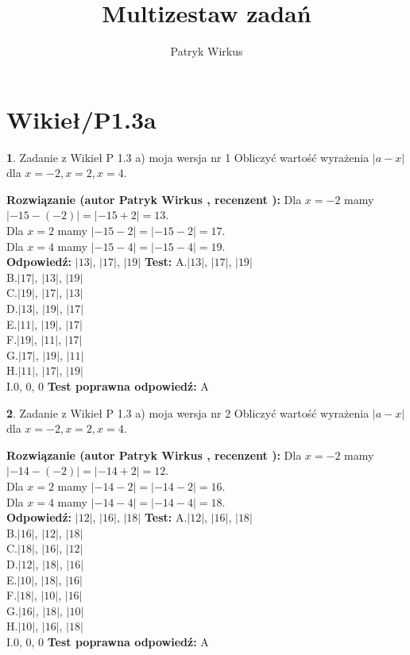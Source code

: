 \documentclass[12pt, a4paper]{article}
\title{Multizestaw zadań}
\author{Patryk Wirkus}
\date{}
\theoremstyle{definition} %
\newtheorem{zad}{}
\newcommand{\kategoria}[1]{\section{#1}}
\newcommand{\zadStart}[1]{\begin{zad}#1\newline}
\newcommand{\zadStop}{\end{zad}}
\newcommand{\rozwStart}[2]{\noindent \textbf{Rozwiązanie (autor #1 , recenzent #2): }\newline}
\newcommand{\rozwStop}{\newline}
\newcommand{\odpStart}{\noindent \textbf{Odpowiedź:}\newline}
\newcommand{\odpStop}{\newline}
\newcommand{\testStart}{\noindent \textbf{Test:}\newline}
\newcommand{\testStop}{\newline}
\newcommand{\kluczStart}{\noindent \textbf{Test poprawna odpowiedź:}\newline}
\newcommand{\kluczStop}{\newline}
\begin{document}
\maketitle

\kategoria{Wikieł/P1.3a}


\zadStart{Zadanie z Wikieł P 1.3 a) moja wersja nr 1}
Obliczyć wartość wyrażenia $|a - x|$ dla $x=-2,x=2,x=4$.
\zadStop
\rozwStart{Patryk Wirkus}{}
Dla $x = -2$ mamy $|-15 - (-2)| = |-15 + 2| = 13$.\\
Dla $x = 2$ mamy $|-15 - 2| = |-15 - 2| = 17$.\\
Dla $x = 4$ mamy $|-15 - 4| = |-15 - 4| = 19$.\\
\rozwStop
\odpStart
$|13|$, $|17|$, $|19|$
\odpStop
\testStart
A.$|13|$, $|17|$, $|19|$\\
B.$|17|$, $|13|$, $|19|$\\
C.$|19|$, $|17|$, $|13|$\\
D.$|13|$, $|19|$, $|17|$\\
E.$|11|$, $|19|$, $|17|$\\
F.$|19|$, $|11|$, $|17|$\\
G.$|17|$, $|19|$, $|11|$\\
H.$|11|$, $|17|$, $|19|$\\
I.$0$, $0$, $0$
\testStop
\kluczStart
A
\kluczStop



\zadStart{Zadanie z Wikieł P 1.3 a) moja wersja nr 2}
Obliczyć wartość wyrażenia $|a - x|$ dla $x=-2,x=2,x=4$.
\zadStop
\rozwStart{Patryk Wirkus}{}
Dla $x = -2$ mamy $|-14 - (-2)| = |-14 + 2| = 12$.\\
Dla $x = 2$ mamy $|-14 - 2| = |-14 - 2| = 16$.\\
Dla $x = 4$ mamy $|-14 - 4| = |-14 - 4| = 18$.\\
\rozwStop
\odpStart
$|12|$, $|16|$, $|18|$
\odpStop
\testStart
A.$|12|$, $|16|$, $|18|$\\
B.$|16|$, $|12|$, $|18|$\\
C.$|18|$, $|16|$, $|12|$\\
D.$|12|$, $|18|$, $|16|$\\
E.$|10|$, $|18|$, $|16|$\\
F.$|18|$, $|10|$, $|16|$\\
G.$|16|$, $|18|$, $|10|$\\
H.$|10|$, $|16|$, $|18|$\\
I.$0$, $0$, $0$
\testStop
\kluczStart
A
\kluczStop
\end{document}
